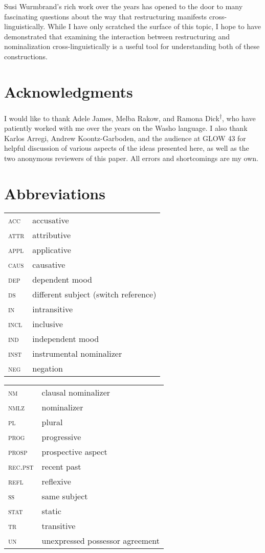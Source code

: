 \documentclass[output=paper]{langscibook}
\begin{document}
 Susi Wurmbrand's rich work over the years has opened to the door to many fascinating questions about the way that restructuring manifests cross-linguistically. While I have only scratched  the surface of this topic, I hope to have demonstrated that examining the interaction between restructuring and nominalization cross-linguistically is a useful tool for understanding both of these constructions.



\section*{Acknowledgments}
I would like to thank Adele James, Melba Rakow, and Ramona Dick\textsuperscript{†}, who have patiently worked with me over the years on the Washo language. I also thank Karlos Arregi, Andrew Koontz-Garboden, and the audience at GLOW 43 for helpful discussion of various aspects of the ideas presented here, as well as the two anonymous reviewers of this paper. All errors and shortcomings are my own.



\section*{Abbreviations}
\begin{tabularx}{.5\textwidth}{@{}lQ}
{\scshape acc} & accusative\\
{\scshape attr} & attributive\\ 
{\scshape appl} & applicative\\
{\scshape caus} & causative\\
{\scshape dep} & dependent mood\\
{\scshape ds} & different subject (switch reference)\\
{\scshape in} & intransitive \\
{\scshape incl} & inclusive\\
{\scshape ind} & independent mood\\
{\scshape inst} & instrumental nominalizer\\
{\scshape neg} & negation\\
\end{tabularx}%
\begin{tabularx}{.5\textwidth}{lQ@{}}
 {\scshape nm} & clausal nominalizer\\
 {\scshape nmlz} & nominalizer\\
 {\scshape pl} & plural\\
 {\scshape prog} & progressive\\
 {\scshape prosp} & prospective aspect\\
 {\scshape rec.pst} & recent past\\
 {\scshape refl} & reflexive\\
 {\scshape ss} & same subject\\
 {\scshape stat} & static\\
 {\scshape tr} & transitive\\
 {\scshape un} & unexpressed possessor agreement\\
\end{tabularx}

{\sloppy\printbibliography[heading=subbibliography,notkeyword=this]}
\end{document}
